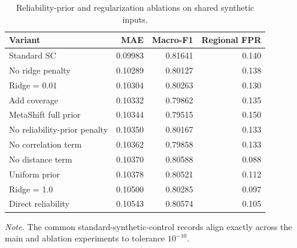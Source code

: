 \begin{table}[tbp]
\centering
\caption{Reliability-prior and regularization ablations on shared synthetic inputs.}
\label{tab:ablations}
\scriptsize
\begin{tabular}{lrrr}
\toprule
Variant & MAE & Macro-F1 & Regional FPR \\
\midrule
Standard SC & 0.09983 & 0.81641 & 0.140 \\
No ridge penalty & 0.10289 & 0.80127 & 0.138 \\
Ridge = 0.01 & 0.10304 & 0.80263 & 0.130 \\
Add coverage & 0.10332 & 0.79862 & 0.135 \\
MetaShift full prior & 0.10344 & 0.79515 & 0.150 \\
No reliability-prior penalty & 0.10350 & 0.80167 & 0.133 \\
No correlation term & 0.10362 & 0.79858 & 0.133 \\
No distance term & 0.10370 & 0.80588 & 0.088 \\
Uniform prior & 0.10378 & 0.80521 & 0.112 \\
Ridge = 1.0 & 0.10500 & 0.80285 & 0.097 \\
Direct reliability & 0.10543 & 0.80574 & 0.105 \\
\bottomrule
\end{tabular}
\par\smallskip
\begin{minipage}{0.94\linewidth}
\footnotesize\textit{Note.} The common standard-synthetic-control records align exactly across the main and ablation experiments to tolerance $10^{-10}$.
\end{minipage}
\end{table}

